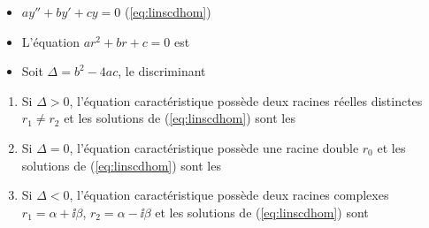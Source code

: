 \begin{frame}
\begin{itemize}

  \item $ay''+by'+cy=0$ \quad (\ref{eq:linscdhom})
  \pause
  \item L'équation $ar^2+br+c=0$ est 
\pause
  \item Soit $\Delta= b^2-4ac$, le discriminant
\end{itemize}
\vspace*{-1ex}\pause
{%
\begin{theoreme}
\begin{enumerate}
\item Si $\Delta >0$, l'équation caractéristique possède deux racines réelles distinctes 
$r_1\neq r_2$
\pause et les solutions de (\ref{eq:linscdhom}) sont les
\vspace*{-0.8ex}
\vspace*{-1.5ex}\pause
\item Si $\Delta=0$, l'équation caractéristique possède une racine double $r_0$ 
\pause et les solutions de (\ref{eq:linscdhom}) sont les
\vspace*{-0.8ex}
\vspace*{-1.5ex}\pause
\item Si $\Delta<0$, l'équation caractéristique possède deux racines complexes 
$r_1=\alpha+\ii \beta$, $r_2=\alpha-\ii \beta$ 
\pause et les solutions de (\ref{eq:linscdhom}) sont 
\vspace*{-0.8ex}

\end{enumerate}
\end{theoreme}
}
\end{frame}


